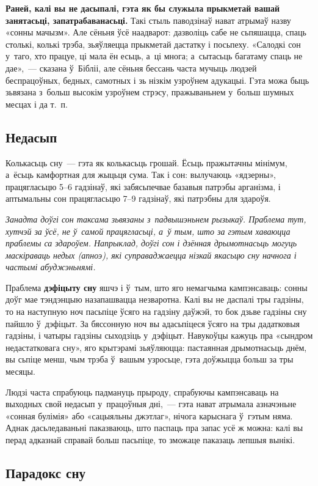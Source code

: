 \textbf{Раней, калі вы не дасыпалі, гэта як бы служыла прыкметай вашай занятасьці, запатрабаванасьці.} Такі стыль паводзінаў нават атрымаў назву «сонны мачызм». Але сёньня ўсё наадварот: дазволіць сабе не сьпяшацца, спаць столькі, колькі трэба, зьяўляецца прыкметай дастатку і посьпеху. «Салодкі сон у~таго, хто працуе, ці мала ён есьць, а~ці многа; а~сытасьць багатаму спаць не дае»,~--- сказана ў~Бібліі, але сёньня бессань часта мучыць людзей беспрацоўных, бедных, самотных і зь нізкім узроўнем адукацыі. Гэта можа быць зьвязана з~больш высокім узроўнем стрэсу, пражываньнем у~больш шумных месцах і да т.~п.

\subsection*{Недасып}

Колькасьць сну~--- гэта як колькасьць грошай. Ёсьць пражытачны мінімум, а~ёсьць камфортная для жыцьця сума. Так і сон: вылучаюць «ядзерны», працягласьцю 5--6 гадзінаў, які забясьпечвае базавыя патрэбы арганізма, і аптымальны сон працягласьцю 7--9 гадзінаў, які патрэбны для здароўя.

\emph{Занадта доўгі сон таксама зьвязаны з~падвышэньнем рызыкаў. Праблема тут, хутчэй за ўсё, не ў~самой працягласьці, а~ў тым, што за гэтым хаваюцца праблемы са здароўем. Напрыклад, доўгі сон і дзённая дрымотнасьць могуць маскіраваць недых (апноэ), які суправаджаецца нізкай якасьцю сну начнога і частымі абуджэньнямі.}

Праблема \textbf{дэфіцыту сну} яшчэ і ў~тым, што яго немагчыма кампэнсаваць: сонны доўг мае тэндэнцыю назапашвацца незваротна. Калі вы не даспалі тры гадзіны, то на наступную ноч пасьпіце ўсяго на гадзіну даўжэй, то бок дзьве гадзіны сну пайшло ў~дэфіцыт. За бяссонную ноч вы адасьпіцеся ўсяго на тры дадатковыя гадзіны, і чатыры гадзіны сыходзіць у~дэфіцыт. Навукоўцы кажуць пра «сындром недастатковага сну», яго крытэрамі зьяўляюцца: пастаянная дрымотнасьць днём, вы сьпіце менш, чым трэба ў~вашым узросьце, гэта доўжыцца больш за тры месяцы.

Людзі часта спрабуюць падмануць прыроду, спрабуючы кампэнсаваць на выходных свой недасып у~працоўныя дні,~--- гэта нават атрымала азначэньне «сонная булімія» або «сацыяльны джэтлаг», нічога карыснага ў~гэтым няма. Аднак дасьледаваньні паказваюць, што паспаць пра запас усё ж можна: калі вы перад адказнай справай больш пасьпіце, то зможаце паказаць лепшыя вынікі.

\subsection*{Парадокс сну}

